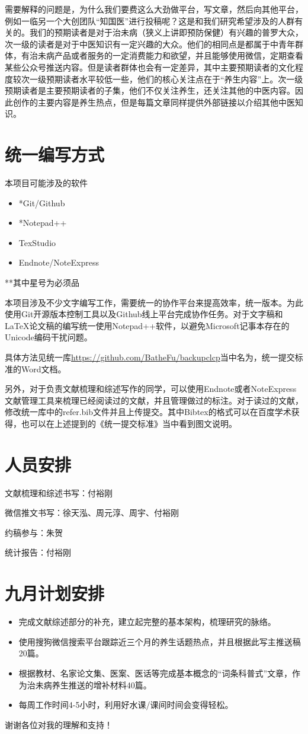 \documentclass{article}
\begin{document}
    需要解释的问题是，为什么我们要费这么大劲做平台，写文章，然后向其他平台，例如一临另一个大创团队“知国医”进行投稿呢？这是和我们研究希望涉及的人群有关的。我们的预期读者是对于治未病（狭义上讲即预防保健）有兴趣的普罗大众，次一级的读者是对于中医知识有一定兴趣的大众。他们的相同点是都属于中青年群体，有治未病产品或者服务的一定消费能力和欲望，并且能够使用微信，定期查看某些公众号推送内容。但是读者群体也会有一定差异，其中主要预期读者的文化程度较次一级预期读者水平较低一些，他们的核心关注点在于“养生内容”上。次一级预期读者是主要预期读者的子集，他们不仅关注养生，还关注其他的中医内容。因此创作的主要内容是养生热点，但是每篇文章同样提供外部链接以介绍其他中医知识。
    \section{统一编写方式}
    \begin{spacing}{0.7}
    本项目可能涉及的软件
    \begin{itemize}
        \item *Git/Github
        \item *Notepad++
        \item TexStudio
        \item Endnote/NoteExpress
    \end{itemize}
**其中星号为必须品
\newline
\end{spacing}
本项目涉及不少文字编写工作，需要统一的协作平台来提高效率，统一版本。为此使用Git开源版本控制工具以及Github线上平台完成协作任务。对于文字稿和\LaTeX 论文稿的编写统一使用Notepad++软件，以避免Microsoft记事本存在的Unicode编码干扰问题。

具体方法见统一库\url{https://github.com/BatheFu/backupclcp}当中名为，统一提交标准的Word文档。
    
    另外，对于负责文献梳理和综述写作的同学，可以使用Endnote或者NoteExpress文献管理工具来梳理已经阅读过的文献，并且管理做过的标注。对于读过的文献，修改统一库中的refer.bib文件并且上传提交。其中Bibtex的格式可以在百度学术获得，也可以在上述提到的《统一提交标准》当中看到图文说明。
    \section{人员安排}
    文献梳理和综述书写：付裕刚
    
    微信推文书写：徐天泓、周元淳、周宇、付裕刚
    
    约稿参与：朱贺
    
    统计报告：付裕刚
    
    \section{九月计划安排}
    \begin{itemize}
        \item 完成文献综述部分的补充，建立起完整的基本架构，梳理研究的脉络。
        \item 使用搜狗微信搜索平台跟踪近三个月的养生话题热点，并且根据此写主推送稿20篇。
        \item 根据教材、名家论文集、医案、医话等完成基本概念的“词条科普式”文章，作为治未病养生推送的增补材料40篇。
        \item 每周工作时间4-5小时，利用好水课/课间时间会变得轻松。
    \end{itemize}

谢谢各位对我的理解和支持！
\end{document}
